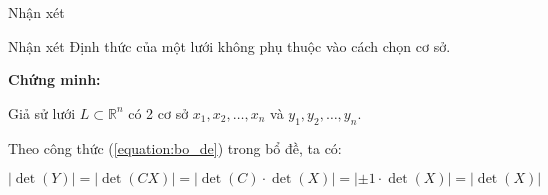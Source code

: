 \begin{frame}{Nhận xét}

\begin{block}{Nhận xét}
Định thức của một lưới không phụ thuộc vào cách chọn cơ sở.
\end{block}

\textbf{Chứng minh:}

Giả sử lưới $L \subset \mathbb{R}^n$ có 2 cơ sở $x_1, x_2, \ldots, x_n$ và $y_1, y_2, \ldots, y_n$.

Theo công thức (\ref{equation:bo_de}) trong bổ đề, ta có:

\[
|\det(Y)| = |\det(CX)| = |\det(C) \cdot \det(X)| = |\pm 1 \cdot \det(X)| = |\det(X)|
\]

\end{frame}
